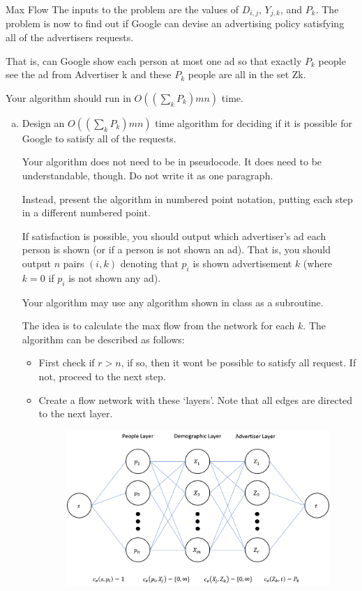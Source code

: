 \documentclass{article}
\numberwithin{table}{section}
\numberwithin{figure}{section}
\begin{document}
\begin{section}{Max Flow}
The inputs to the problem are the values of $D_{i,j}$, $Y_{j,k}$, and $P_k$. The problem is now to find out if Google can devise an advertising policy satisfying all of the advertisers requests.

That is, can Google show each person at most one ad so that exactly $P_k$ people see the ad from Advertiser k and these $P_k$ people are all in the set Zk.

Your algorithm should run in $O ((\sum_k P_k) mn)$ time.

\begin{enumerate}[(a)]
    \item Design an $O ((\sum_k P_k) mn)$ time algorithm for deciding if it is possible for Google to satisfy all of the requests.
    
    Your algorithm does not need to be in pseudocode. It does need to be understandable, though. Do not write it as one paragraph. 
    
    Instead, present the algorithm in numbered point notation, putting each step in a different numbered point.

    If satisfaction is possible, you should output which advertiser’s ad each person is shown (or if a person is not shown an ad). That is, you should output $n$ pairs $(i, k)$ denoting that $p_i$ is shown advertisement $k$ (where $k = 0$ if $p_i$ is not shown any ad).

    Your algorithm may use any algorithm shown in class as a subroutine.
    
    \begin{tcolorbox}[breakable]
        The idea is to calculate the max flow from the network for each $k$. The algorithm can be described as follows:
        \begin{itemize}
            \item First check if $r > n$, if so, then it wont be possible to satisfy all request. If not, proceed to the next step.
            
            \item Create a flow network with these `layers'. Note that all edges are directed to the next layer.
            
            \begin{figure}[H]
                \centering
                \includegraphics[width=0.9\linewidth]{figures/p2/1.png}
            \end{figure}


\end{itemize}
\end{tcolorbox}
\end{enumerate}
\end{section}
\end{document}
